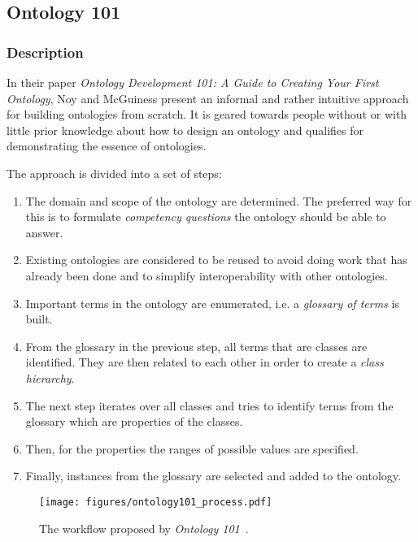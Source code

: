 \subsection{Ontology 101}
\label{subsec:approach1}

\subsubsection{Description}

In their paper \emph{Ontology Development 101: A Guide to Creating Your First Ontology}\cite{Ontology101}, Noy and McGuiness present an informal and rather intuitive approach for building ontologies from scratch. It is geared towards people without or with little prior knowledge about how to design an ontology and qualifies for demonstrating the essence of ontologies.

The approach is divided into a set of steps:
\begin{enumerate}
  \item The domain and scope of the ontology are determined. The preferred way for this is to formulate \emph{competency questions} the ontology should be able to answer.
  \item Existing ontologies are considered to be reused to avoid doing work that has already been done and to simplify interoperability with other ontologies.
  \item Important terms in the ontology are enumerated, i.e. a \emph{glossary of terms} is built.
  \item From the glossary in the previous step, all terms that are classes are identified. They are then related to each other in order to create a \emph{class hierarchy}.
   \item The next step iterates over all classes and tries to identify terms from the glossary which are properties of the classes.
  \item Then, for the properties the ranges of possible values are specified.
  \item Finally, instances from the glossary are selected and added to the ontology.
\end{enumerate}

\begin{figure}
\centering
\texttt{[image: figures/ontology101\_process.pdf]}
\caption{The workflow proposed by \emph{Ontology 101}~\cite{Ontology101}.}
\label{fig:ontology101_process}
\end{figure}

